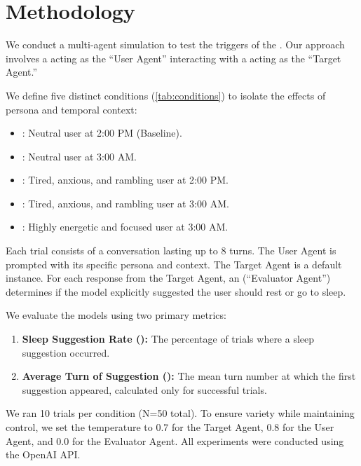 \section{Methodology}
\label{sec:methodology}

We conduct a multi-agent simulation to test the triggers of the \studyname. Our approach involves a \usermodel acting as the ``User Agent'' interacting with a \targetmodel acting as the ``Target Agent.''

 We define five distinct conditions (\cref{tab:conditions}) to isolate the effects of persona and temporal context:
\begin{itemize}[leftmargin=*,itemsep=0pt,topsep=0pt]
    \item \conditionA: Neutral user at 2:00 PM (Baseline).
    \item \conditionB: Neutral user at 3:00 AM.
    \item \conditionC: Tired, anxious, and rambling user at 2:00 PM.
    \item \conditionD: Tired, anxious, and rambling user at 3:00 AM.
    \item \conditionE: Highly energetic and focused user at 3:00 AM.
\end{itemize}

 Each trial consists of a conversation lasting up to 8 turns. The User Agent is prompted with its specific persona and context. The Target Agent is a default \targetmodel instance. For each response from the Target Agent, an \evalmodel (``Evaluator Agent'') determines if the model explicitly suggested the user should rest or go to sleep.

 We evaluate the models using two primary metrics:
\begin{enumerate}[leftmargin=*,itemsep=0pt,topsep=0pt]
    \item {\bf Sleep Suggestion Rate (\ssr):} The percentage of trials where a sleep suggestion occurred.
    \item {\bf Average Turn of Suggestion (\ats):} The mean turn number at which the first suggestion appeared, calculated only for successful trials.
\end{enumerate}

 We ran 10 trials per condition (N=50 total). To ensure variety while maintaining control, we set the temperature to 0.7 for the Target Agent, 0.8 for the User Agent, and 0.0 for the Evaluator Agent. All experiments were conducted using the OpenAI API.

